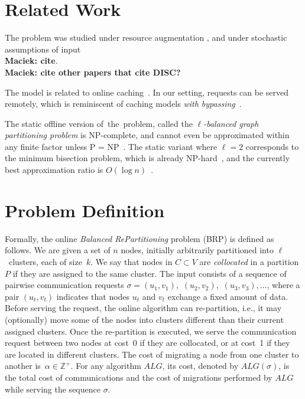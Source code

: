 \documentclass[manuscript,screen=true]{acmart}
\newcommand{\OBRP}{BRP}
\newcommand\maciek[1]{\color{brown}\textbf{\\ Maciek: #1}\color{black}}
\begin{document}
\section{Related Work}

The problem was studied under resource augmentation \cite{repartition-disc}, and under stochastic assumptions of input\maciek{cite}.\maciek{cite other papers that cite DISC?}

The model is related to online
caching~\cite{SleTar85,FKLMSY91,McGSle91,AcChNo00}. In our
setting, requests can be served remotely, which is
reminiscent of caching models \emph{with
bypassing}~\cite{EpImLN11,EpImLN15,Irani02}.

The static offline version of~the~problem, called the
\emph{$\ell$-balanced graph partitioning problem} is 
NP-complete, and cannot even be approximated within any finite factor unless P
= NP~\cite{AndRae06}. The static
variant where $\ell = 2$ corresponds to the minimum bisection problem, which
is already NP-hard~\cite{GaJoSt76}, and 
the currently best approximation ratio is $O(\log n)$~\cite{SarVaz95,ArKaKa99,FeKrNi00,FeiKra02,KraFei06,Raec08}.




\section{Problem Definition}
\label{sec:problem-definition}

Formally, the online \emph{Balanced RePartitioning} problem (\OBRP{}) is defined as
follows. We are given a set of $n$ nodes,
initially arbitrarily partitioned into $\ell$~clusters,
each of size~$k$.
We say that nodes in $C \subset V$ are \emph{collocated} in a partition $P$
if they are assigned to the same cluster.
The input consists of a sequence of pairwise communication requests
$\sigma = (u_1,v_1),$ $(u_2,v_2),$ $(u_3,v_3), \ldots$,
where a pair $(u_t,v_t)$ indicates that nodes $u_t$ and $v_t$ exchange a fixed amount of data.
Before serving the request,
the online algorithm
can re-partition,
i.e.,
it may (optionally) move some of the nodes into clusters different than their current assigned clusters.
Once the re-partition is executed,
we serve
the communication request between two  nodes at cost~0 if they are collocated,
or at cost~1 if they are located in different clusters.
The cost of migrating a node from one cluster to another
is~$\alpha \in \mathbb{Z}^+$.
For any algorithm $ALG$,
its cost,
denoted by $ALG(\sigma)$,
is the total cost of communications and
the cost of migrations performed by $ALG$ while serving the sequence $\sigma$.
\end{document}

